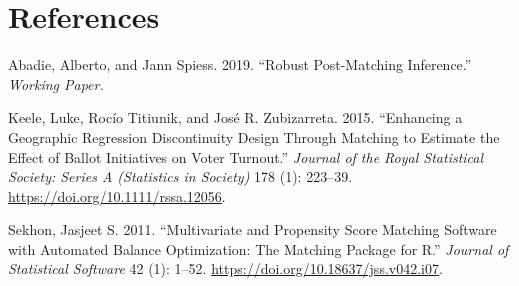 \documentclass[
  12pt,
]{article}
\newlength{\cslhangindent}
\newenvironment{cslreferences}%
  {\setlength{\parindent}{0pt}%
  \everypar{\setlength{\hangindent}{\cslhangindent}}\ignorespaces}%
  {\par}
\begin{document}
\newpage

\hypertarget{references}{%
\section*{References}\label{references}}

\hypertarget{refs}{}
\begin{cslreferences}
\leavevmode\hypertarget{ref-Abadie2019}{}%
Abadie, Alberto, and Jann Spiess. 2019. ``Robust Post-Matching Inference.'' \emph{Working Paper.}

\leavevmode\hypertarget{ref-Keele2015}{}%
Keele, Luke, Rocío Titiunik, and José R. Zubizarreta. 2015. ``Enhancing a Geographic Regression Discontinuity Design Through Matching to Estimate the Effect of Ballot Initiatives on Voter Turnout.'' \emph{Journal of the Royal Statistical Society: Series A (Statistics in Society)} 178 (1): 223--39. \url{https://doi.org/10.1111/rssa.12056}.

\leavevmode\hypertarget{ref-Sekhon2011}{}%
Sekhon, Jasjeet S. 2011. ``Multivariate and Propensity Score Matching Software with Automated Balance Optimization: The Matching Package for R.'' \emph{Journal of Statistical Software} 42 (1): 1--52. \url{https://doi.org/10.18637/jss.v042.i07}.
\end{cslreferences}
\end{document}
